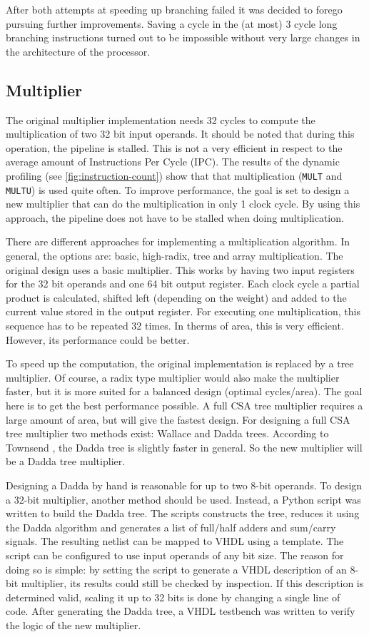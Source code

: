 \documentclass[final]{article}
\begin{document}
After both attempts at speeding up branching failed it was decided to forego pursuing further improvements.
Saving a cycle in the (at most) 3 cycle long branching instructions turned out to be impossible without very large changes in the architecture of the processor.

\subsection{Multiplier}
The original multiplier implementation needs 32 cycles to compute the multiplication of two 32 bit input operands.
It should be noted that during this operation, the pipeline is stalled.
This is not a very efficient in respect to the average amount of Instructions Per Cycle (IPC).
The results of the dynamic profiling (see \cref{fig:instruction-count}) show that that multiplication (\texttt{MULT} and \texttt{MULTU}) is used quite often.
To improve performance, the goal is set to design a new multiplier that can do the multiplication in only 1 clock cycle.
By using this approach, the pipeline does not have to be stalled when doing multiplication.

There are different approaches for implementing a multiplication algorithm.
In general, the options are: basic, high-radix, tree and array multiplication.
The original design uses a basic multiplier.
This works by having two input registers for the 32 bit operands and one 64 bit output register.
Each clock cycle a partial product is calculated, shifted left (depending on the weight) and added to the current value stored in the output register.
For executing one multiplication, this sequence has to be repeated 32 times.
In therms of area, this is very efficient.
However, its performance could be better.

To speed up the computation, the original implementation is replaced by a tree multiplier.
Of course, a radix type multiplier would also make the multiplier faster, but it is more suited for a balanced design (optimal cycles/area).
The goal here is to get the best performance possible.
A full CSA tree multiplier requires a large amount of area, but will give the fastest design.
For designing a full CSA tree multiplier two methods exist: Wallace and Dadda trees.
According to Townsend \cite{townsend}, the Dadda tree is slightly faster in general.
So the new multiplier will be a Dadda tree multiplier.

Designing a Dadda by hand is reasonable for up to two 8-bit operands.
To design a 32-bit multiplier, another method should be used.
Instead, a Python script was written to build the Dadda tree.
The scripts constructs the tree, reduces it using the Dadda algorithm and generates a list of full/half adders and sum/carry signals.
The resulting netlist can be mapped to VHDL using a template.
The script can be configured to use input operands of any bit size.
The reason for doing so is simple: by setting the script to generate a VHDL description of an 8-bit multiplier, its results could still be checked by inspection.
If this description is determined valid, scaling it up to 32 bits is done by changing a single line of code.
After generating the Dadda tree, a VHDL testbench was written to verify the logic of the new multiplier.
\end{document}
